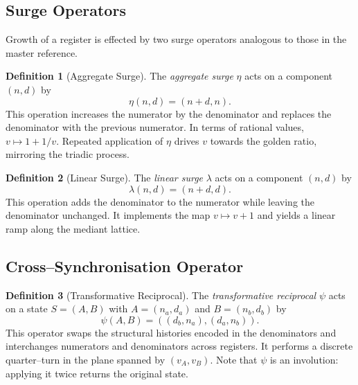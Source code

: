 \documentclass[11pt, letterpaper]{article}
\newcommand{\lop}{\lambda}
\newcommand{\aop}{\eta}
\newcommand{\psiop}{\psi}
\theoremstyle{definition}
\newtheorem{definition}{Definition}[section]
\theoremstyle{plain}
\begin{document}
\subsection{Surge Operators}

Growth of a register is effected by two surge operators analogous to those in
the master reference.

\begin{rsbox}
  \begin{definition}[Aggregate Surge]
  The \emph{aggregate surge} $\aop$ acts on a component $(n,d)$ by
  \begin{equation*}
    \aop(n,d) = (n + d, n).
  \end{equation*}
  This operation increases the numerator by the denominator and replaces the
  denominator with the previous numerator.  In terms of rational values,
  $v\mapsto 1 + 1/v$.  Repeated application of $\aop$ drives $v$ towards the
  golden ratio, mirroring the triadic process.
  \end{definition}
\end{rsbox}

\begin{rsbox}
  \begin{definition}[Linear Surge]
  The \emph{linear surge} $\lop$ acts on a component $(n,d)$ by
  \begin{equation*}
    \lop(n,d) = (n + d, d).
  \end{equation*}
  This operation adds the denominator to the numerator while leaving the
  denominator unchanged.  It implements the map $v\mapsto v+1$ and yields a
  linear ramp along the mediant lattice.
  \end{definition}
\end{rsbox}

\subsection{Cross–Synchronisation Operator}

\begin{rsbox}
  \begin{definition}[Transformative Reciprocal]
  The \emph{transformative reciprocal} $\psiop$ acts on a state
  $S=(A,B)$ with $A=(n_a,d_a)$ and $B=(n_b,d_b)$ by
  \begin{equation*}
    \psiop(A,B) = ((d_b,n_a),(d_a,n_b)).
  \end{equation*}
  This operator swaps the structural histories encoded in the denominators and
  interchanges numerators and denominators across registers.  It performs a
  discrete quarter–turn in the plane spanned by $(v_A,v_B)$.  Note that
  $\psiop$ is an involution: applying it twice returns the original state.
  \end{definition}
\end{rsbox}
\end{document}
